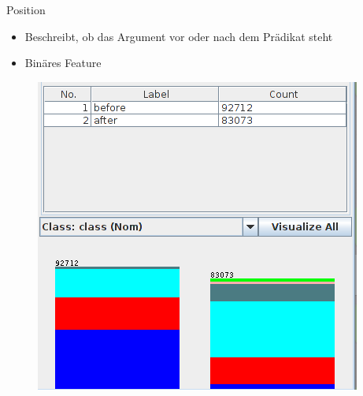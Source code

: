 \documentclass[10pt]{beamer}
\begin{document}
  \begin{frame}{Position}
   \begin{itemize}
    \item Beschreibt, ob das Argument vor oder nach dem Prädikat steht
    \item Binäres Feature
   \end{itemize}
   
   \begin{figure}
   	\begin{center}
   		\includegraphics[scale=0.3]{position}
   	\end{center}
   \end{figure}
  \end{frame}
  
\end{document}
